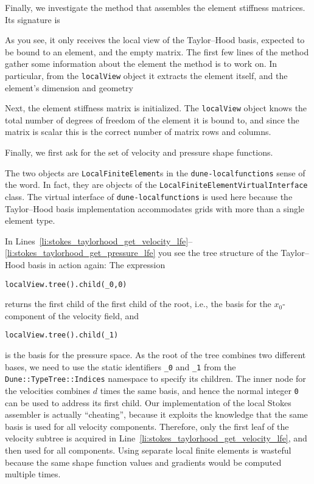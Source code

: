 \documentclass[a4paper,10pt,headings=normal,bibliography=totoc]{scrartcl}
\newcommand{\cpp}[1]{\lstinline[basicstyle=\ttfamily]!#1!}
\newcommand{\dunemodule}[1]{\texttt{#1}}
\begin{document}
Finally, we investigate the method that assembles the element stiffness matrices.  Its signature is
%

%
As you see, it only receives the local view of the Taylor--Hood basis, expected to be bound to an element,
and the empty matrix.
The first few lines of the method gather some information about the element the method is to work on.
In particular, from the \cpp{localView} object it extracts the element itself, and the element's dimension and
geometry
%

%
Next, the element stiffness matrix is initialized.  The \cpp{localView} object knows the total number of
degrees of freedom of the element it is bound to, and since the matrix is scalar this is the correct
number of matrix rows and columns.
%

%
Finally, we first ask for the set of velocity and pressure shape functions.
%

%
The two objects are \cpp{LocalFiniteElement}s in the \dunemodule{dune-localfunctions} sense of the word.
In fact, they are objects of the
\cpp{LocalFiniteElementVirtualInterface} class.  The virtual interface of \dunemodule{dune-localfunctions} is used here
because the Taylor--Hood basis implementation accommodates grids with more than a single element type.

In Lines~\ref{li:stokes_taylorhood_get_velocity_lfe}--\ref{li:stokes_taylorhood_get_pressure_lfe} you see the tree structure of the Taylor--Hood basis in action again:
The expression
\begin{lstlisting}
localView.tree().child(_0,0)
\end{lstlisting}
returns the first child of the first child of the root, i.e., the basis for the $x_0$-component of the velocity field,
and
\begin{lstlisting}
localView.tree().child(_1)
\end{lstlisting}
is the basis for the pressure space.
As the root of the tree combines two different bases, we need to use the static identifiers \cpp{_0} and \cpp{_1}
from the \cpp{Dune::TypeTree::Indices} namespace to specify its children.  The inner node for the velocities
combines $d$ times the same basis, and hence the normal integer \cpp{0} can be used to address its first child.
Our implementation of the local Stokes assembler is actually ``cheating'', because it exploits the knowledge
that the same basis is used for all velocity components.  Therefore, only the first leaf of the velocity
subtree is acquired in Line~\ref{li:stokes_taylorhood_get_velocity_lfe}, and then used for all components.
Using separate local finite elements is wasteful because the same shape function values and gradients
would be computed multiple times.
\end{document}
